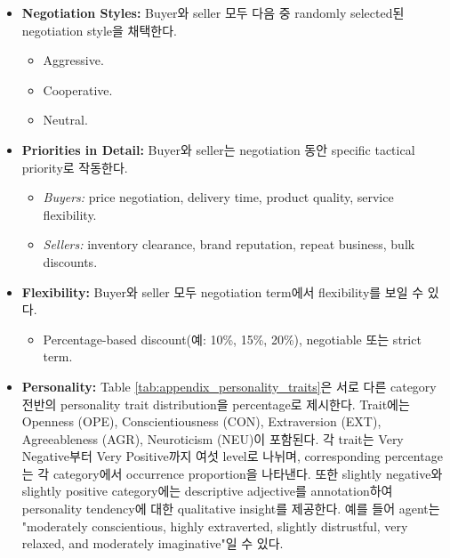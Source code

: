 \begin{itemize}
    \item \textbf{Negotiation Styles:} Buyer와 seller 모두 다음 중 randomly selected된 negotiation style을 채택한다.
    \begin{itemize}
        \item Aggressive.
        \item Cooperative.
        \item Neutral.
    \end{itemize}

    \item \textbf{Priorities in Detail:}
    Buyer와 seller는 negotiation 동안 specific tactical priority로 작동한다.
    \begin{itemize}
        \item \textit{Buyers:} price negotiation, delivery time, product quality, service flexibility.
        \item \textit{Sellers:} inventory clearance, brand reputation, repeat business, bulk discounts.
    \end{itemize}

    \item \textbf{Flexibility:}
    Buyer와 seller 모두 negotiation term에서 flexibility를 보일 수 있다.
    \begin{itemize}
        \item Percentage-based discount(예: 10\%, 15\%, 20\%), negotiable 또는 strict term.
    \end{itemize}

    \item \textbf{Personality:}
    Table \ref{tab:appendix_personality_traits}은 서로 다른 category 전반의 personality trait distribution을 percentage로 제시한다. Trait에는 Openness (OPE), Conscientiousness (CON), Extraversion (EXT), Agreeableness (AGR), Neuroticism (NEU)이 포함된다. 각 trait는 Very Negative부터 Very Positive까지 여섯 level로 나뉘며, corresponding percentage는 각 category에서 occurrence proportion을 나타낸다. 또한 slightly negative와 slightly positive category에는 descriptive adjective를 annotation하여 personality tendency에 대한 qualitative insight를 제공한다. 예를 들어 agent는 "moderately conscientious, highly extraverted, slightly distrustful, very relaxed, and moderately imaginative"일 수 있다.
\end{itemize}

